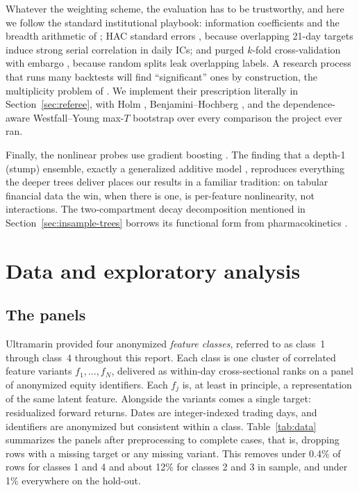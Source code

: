 \documentclass[11pt]{article}
\begin{document}
Whatever the weighting scheme, the evaluation has to be trustworthy, and here we follow the
standard institutional playbook: information coefficients and the breadth arithmetic of
\citet{grinold2000}; HAC standard errors \citep{newey1987}, because overlapping 21-day
targets induce strong serial correlation in daily ICs; and purged $k$-fold cross-validation
with embargo \citep{lopezdeprado2018}, because random splits leak overlapping labels. A
research process that runs many backtests will find ``significant'' ones by construction,
the multiplicity problem of \citet{harvey2016}. We implement their prescription literally
in Section~\ref{sec:referee}, with Holm \citep{holm1979}, Benjamini--Hochberg
\citep{benjamini1995}, and the dependence-aware Westfall--Young max-$T$ bootstrap
\citep{westfall1993} over every comparison the project ever ran.

Finally, the nonlinear probes use gradient boosting \citep{friedman2001,chen2016,ke2017}.
The finding that a depth-1 (stump) ensemble, exactly a generalized additive model
\citep{hastie1986}, reproduces everything the deeper trees deliver places our results in a
familiar tradition: on tabular financial data the win, when there is one, is per-feature
nonlinearity, not interactions. The two-compartment decay decomposition mentioned in
Section~\ref{sec:insample-trees} borrows its functional form from pharmacokinetics
\citep{gibaldi1982}.

\FloatBarrier
\section{Data and exploratory analysis}
\label{sec:data}

\subsection{The panels}
\label{sec:data-panels}

Ultramarin provided four anonymized \emph{feature classes}, referred to as class~1 through
class~4 throughout this report. Each class is one cluster of correlated feature variants
$f_1,\dots,f_N$, delivered as within-day cross-sectional ranks on a panel of anonymized
equity identifiers. Each $f_j$ is, at least in principle, a representation of the same
latent feature. Alongside the variants comes a single target: residualized forward returns.
Dates are integer-indexed trading days, and identifiers are anonymized but consistent
within a class. Table~\ref{tab:data} summarizes the panels after preprocessing to complete
cases, that is, dropping rows with a missing target or any missing variant. This removes
under 0.4\% of rows for classes 1 and 4 and about 12\% for classes 2 and 3 in sample, and
under 1\% everywhere on the hold-out.
\end{document}

